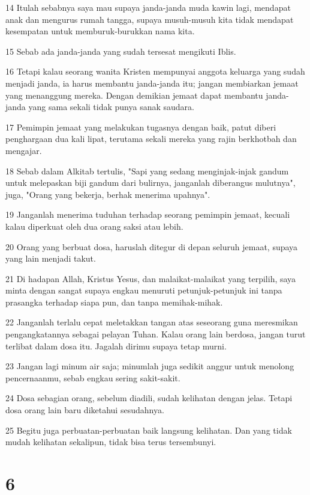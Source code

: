\par 14 Itulah sebabnya saya mau supaya janda-janda muda kawin lagi, mendapat anak dan mengurus rumah tangga, supaya musuh-musuh kita tidak mendapat kesempatan untuk memburuk-burukkan nama kita.
\par 15 Sebab ada janda-janda yang sudah tersesat mengikuti Iblis.
\par 16 Tetapi kalau seorang wanita Kristen mempunyai anggota keluarga yang sudah menjadi janda, ia harus membantu janda-janda itu; jangan membiarkan jemaat yang menanggung mereka. Dengan demikian jemaat dapat membantu janda-janda yang sama sekali tidak punya sanak saudara.
\par 17 Pemimpin jemaat yang melakukan tugasnya dengan baik, patut diberi penghargaan dua kali lipat, terutama sekali mereka yang rajin berkhotbah dan mengajar.
\par 18 Sebab dalam Alkitab tertulis, "Sapi yang sedang menginjak-injak gandum untuk melepaskan biji gandum dari bulirnya, janganlah diberangus mulutnya", juga, "Orang yang bekerja, berhak menerima upahnya".
\par 19 Janganlah menerima tuduhan terhadap seorang pemimpin jemaat, kecuali kalau diperkuat oleh dua orang saksi atau lebih.
\par 20 Orang yang berbuat dosa, haruslah ditegur di depan seluruh jemaat, supaya yang lain menjadi takut.
\par 21 Di hadapan Allah, Kristus Yesus, dan malaikat-malaikat yang terpilih, saya minta dengan sangat supaya engkau menuruti petunjuk-petunjuk ini tanpa prasangka terhadap siapa pun, dan tanpa memihak-mihak.
\par 22 Janganlah terlalu cepat meletakkan tangan atas seseorang guna meresmikan pengangkatannya sebagai pelayan Tuhan. Kalau orang lain berdosa, jangan turut terlibat dalam dosa itu. Jagalah dirimu supaya tetap murni.
\par 23 Jangan lagi minum air saja; minumlah juga sedikit anggur untuk menolong pencernaanmu, sebab engkau sering sakit-sakit.
\par 24 Dosa sebagian orang, sebelum diadili, sudah kelihatan dengan jelas. Tetapi dosa orang lain baru diketahui sesudahnya.
\par 25 Begitu juga perbuatan-perbuatan baik langsung kelihatan. Dan yang tidak mudah kelihatan sekalipun, tidak bisa terus tersembunyi.

\chapter{6}


